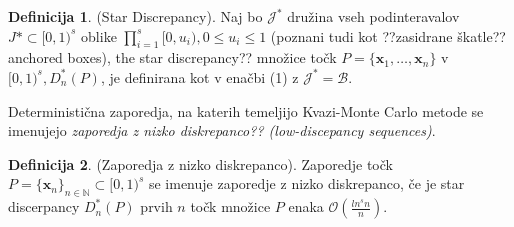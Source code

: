 \documentclass[12pt,a4paper, reqno]{amsart}
\theoremstyle{definition} %
\newtheorem{definicija}{Definicija}[section]
\theoremstyle{plain} %
\newcommand{\N}{\mathbb N}
\newcommand{\geslo}[2]{\noindent\textbf{#1}\hspace*{3mm}\hangindent=\parindent\hangafter=1 #2}
\begin{document}
\begin{definicija}{(Star Discrepancy)}. Naj bo $\mathcal{J}^*$ družina vseh podinteravalov $J* \subset [0,1)^s$ oblike $\prod\limits_{i=1}^s [0,u_i), 0 \leq u_i \leq 1$ (poznani tudi kot ??zasidrane škatle?? anchored boxes), the star discrepancy?? množice točk $P=\{\boldsymbol x_1, \ldots, \boldsymbol x_n \}$ v $[0,1)^s, D^*_n(P)$, je definirana kot v enačbi (1) z $\mathcal{J}^* = \mathcal{B}$.
\end{definicija}


Deterministična zaporedja, na katerih temeljijo Kvazi-Monte Carlo metode se imenujejo \textit{zaporedja z nizko diskrepanco?? (low-discepancy sequences)}.

\begin{definicija}{(Zaporedja z nizko diskrepanco)}.
Zaporedje točk $P = \{\boldsymbol x_n\}_{n\in \N} \subset [0,1)^s$ se imenuje zaporedje z nizko diskrepanco, če je star discerpancy  $D^*_n(P)$ prvih $n$ točk množice $P$ enaka $\mathcal{O}(\frac{ln^sn}{n})$.
\end{definicija}




%
%




\end{document}
